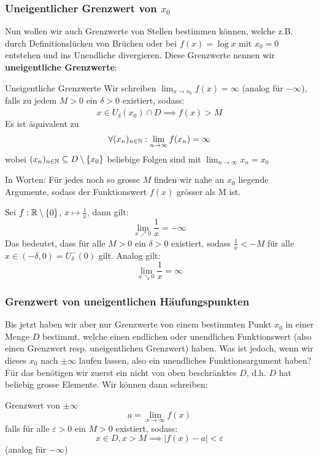 \subsubsection{Uneigentlicher Grenzwert von $x_0$}
Nun wollen wir auch Grenzwerte von Stellen bestimmen können, welche z.B. durch Definitionslücken von Brüchen oder bei $f(x)=\log{x}$ mit $x_0 = 0$ entstehen und ins Unendliche divergieren. Diese Grenzwerte nennen wir \textbf{uneigentliche Grenzwerte}:
\begin{definition}{Uneigentliche Grenzwerte}{}
Wir schreiben $\lim_{x \to x_0}{f(x)} = \infty$ (analog für $-\infty$), falls zu jedem $M > 0$ ein $\delta > 0$ existiert, sodass:
$$x \in \dot{U}_\delta(x_0) \cap D \implies f(x) > M$$
Es ist äquivalent zu 
$$\forall (x_n)_{n \in \mathbb{N}}: \lim_{n \to \infty}{f(x_n)} = \infty $$
wobei $(x_n)_{n \in \mathbb{N}} \subseteq D \setminus \{x_0\}$ beliebige Folgen sind mit $\lim_{n \to \infty}{x_n} = x_0$
\end{definition}
In Worten: Für jedes noch so grosse $M$ finden wir nahe an $x_0$ liegende Argumente, sodass der Funktionswert $f(x)$ grösser als M ist.

\begin{example} Sei $f: \mathbb{R}\setminus\{0\}$, $x \mapsto \frac{1}{x}$, dann gilt:
$$\lim_{x \nearrow 0} \frac{1}{x} = - \infty$$
Das bedeutet, dass für alle $M > 0$ ein $\delta >0$ existiert, sodass $\frac{1}{x} < -M$ für alle $x \in (-\delta, 0) = U_\delta^-(0)$ gilt.
Analog gilt:
$$\lim_{x \searrow 0} \frac{1}{x} = \infty$$
\end{example}

\subsubsection{Grenzwert von uneigentlichen Häufungspunkten}
Bis jetzt haben wir aber nur Grenzwerte von einem bestimmten Punkt $x_0$ in einer Menge $D$ bestimmt, welche einen endlichen oder unendlichen Funktionswert (also einen Grenzwert resp. uneigentlichen Grenzwert) haben. Was ist jedoch, wenn wir dieses $x_0$ nach $\pm \infty$ laufen lassen, also ein unendliches Funktionsargument haben? Für das benötigen wir zuerst ein nicht von oben beschränktes $D$, d.h. $D$ hat beliebig grosse Elemente. Wir können dann schreiben:
\begin{definition}{Grenzwert von $\pm \infty$}{}
$$a = \lim_{x \to \infty} f(x)$$
falls für alle $\varepsilon>0$ ein $M>0$ existiert, sodass:
$$x \in D, x>M \implies |f(x)-a| < \varepsilon$$
(analog für $-\infty$)
\end{definition}

